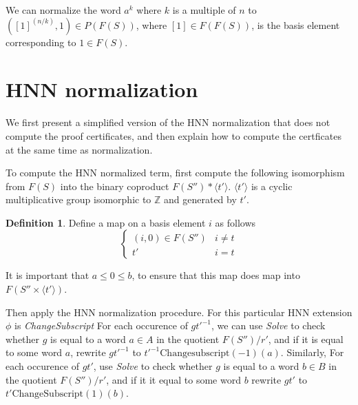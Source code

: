 \documentclass[11pt]{article} %
\theoremstyle{definition}
\theoremstyle{definition}
\theoremstyle{definition}
\theoremstyle{definition}
\theoremstyle{definition}
\newtheorem{defn}[theorem]{Definition}
\theoremstyle{definition}
\begin{document}
We can normalize the word $a^k$ where $k$ is a multiple of $n$ to
$([1]^(n / k), 1) \in P(F(S))$, where $[1] \in F(F(S))$, is the basis element
corresponding to $1 \in F(S)$.


\section{HNN normalization}\label{HNNnorm}

We first present a simplified version of the HNN normalization that does not compute
the proof certificates, and then explain how to compute the certficates at the same time as normalization.

To compute the HNN normalized term, first compute the following isomorphism from $F(S)$ into the binary
coproduct $F(S'') \ast \langle t' \rangle$. $\langle t' \rangle$ is a cyclic
multiplicative group isomorphic to $\mathbb{Z}$ and generated by $t'$.

\begin{defn}\label{tocoprod}
  Define a map on a basis element $i$ as follows
  \begin{equation}
    \begin{cases}
      (i, 0) \in F(S'') & i \ne t \\
      t' & i = t
    \end{cases}
  \end{equation}
\end{defn}

It is important that $a \le 0 \le b$, to ensure that this map does map into $F(S'' \times \langle t' \rangle)$.

Then apply the HNN normalization procedure. For this particular HNN extension
$\phi$ is \textit{ChangeSubscript} %
For each occurence of
$gt'^{-1}$, we can use \textit{Solve} to check whether $g$ is equal
to a word  $a \in A$ in the quotient $F(S'') / r'$, and if it is equal to some word $a$, rewrite
$gt'^{-1}$ to $t'^{-1}\text{Changesubscript}(-1)(a)$. Similarly, For each occurence of $gt'$, use \textit{Solve}
to check whether $g$ is equal to a word $b \in B$ in the quotient $F(S'') / r'$, and if it it equal to
some word $b$ rewrite $gt'$ to $t'\text{ChangeSubscript}(1)(b)$.
\end{document}

